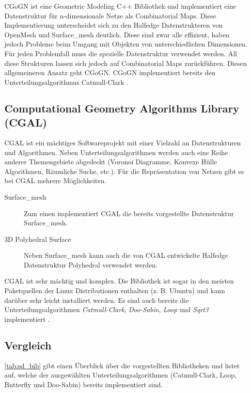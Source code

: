 CGoGN ist eine Geometric Modeling C++ Bibliothek und implementiert eine Datenstruktur für n-dimensionale Netze als Combinatorial Maps.
Diese Implementierung unterscheidet sich zu den Halfedge Datenstrukteren von OpenMesh und Surface\_mesh deutlich.
Diese sind zwar alle effizient, haben jedoch Probleme beim Umgang mit Objekten von unterschiedlichen Dimensionen.
Für jeden Problemfall muss die spezielle Datenstruktur verwendet werden.
All diese Strukturen lassen sich jedoch auf Combinatorial Maps zurückführen.
Diesen allgemeineren Ansatz geht CGoGN.
CGoGN implementiert bereits den Unterteilungsalgorithmus Catmull-Clark \cite{CGoGN.27.07.2015}. 

\subsection{Computational Geometry Algorithms Library (CGAL)}

CGAL ist ein mächtiges Softwareprojekt mit einer Vielzahl an Datenstrukturen und Algorithmen.
Neben Unterteilungsalgorithmen werden auch eine Reihe anderer Themengebiete abgedeckt (Voronoi Diagramme, Konvexe Hülle Algorithmen, Räumliche Suche, etc.).
Für die Repräsentation von Netzen gibt es bei CGAL mehrere Möglichkeiten.

\begin{description}
 \item[Surface\_mesh] Zum einen implementiert CGAL die bereits vorgestellte Datenstruktur Surface\_mesh.
 \item[3D Polyhedral Surface] Neben Surface\_mesh kann auch die von CGAL entwickelte Halfedge Datenstruktur Polyhedral verwendet werden.
\end{description}

CGAL ist sehr mächtig und komplex. Die Bibliothek ist sogar in den meisten Paketquellen der Linux Distributionen enthalten (z. B. Ubuntu)
und kann darüber sehr leicht installiert werden.
Es sind auch bereits die Unterteilungsalgorithmen \emph{Catmull-Clark}, \emph{Doo-Sabin}, \emph{Loop} und \emph{Sqrt3} implementiert \cite{CGAL.27.07.2015}.

\subsection{Vergleich}

\autoref{tab:sd_bib} gibt einen Überblick über die vorgestellten Bibliotheken und listet auf, welche der ausgewählten Unterteilungsalgorithmen
(Catmull-Clark, Loop, Butterfly und Doo-Sabin) bereits implementiert sind.

